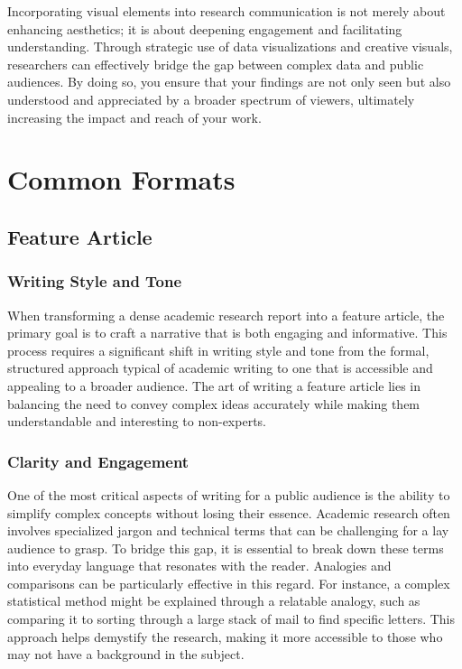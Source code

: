 \documentclass[
]{book}
\begin{document}
Incorporating visual elements into research communication is not merely about enhancing aesthetics; it is about deepening engagement and facilitating understanding. Through strategic use of data visualizations and creative visuals, researchers can effectively bridge the gap between complex data and public audiences. By doing so, you ensure that your findings are not only seen but also understood and appreciated by a broader spectrum of viewers, ultimately increasing the impact and reach of your work.

\section{Common Formats}\label{common-formats}

\subsection{Feature Article}\label{feature-article}

\subsubsection*{Writing Style and Tone}\label{writing-style-and-tone}

When transforming a dense academic research report into a feature article, the primary goal is to craft a narrative that is both engaging and informative. This process requires a significant shift in writing style and tone from the formal, structured approach typical of academic writing to one that is accessible and appealing to a broader audience. The art of writing a feature article lies in balancing the need to convey complex ideas accurately while making them understandable and interesting to non-experts.

\subsubsection*{Clarity and Engagement}\label{clarity-and-engagement}

One of the most critical aspects of writing for a public audience is the ability to simplify complex concepts without losing their essence. Academic research often involves specialized jargon and technical terms that can be challenging for a lay audience to grasp. To bridge this gap, it is essential to break down these terms into everyday language that resonates with the reader. Analogies and comparisons can be particularly effective in this regard. For instance, a complex statistical method might be explained through a relatable analogy, such as comparing it to sorting through a large stack of mail to find specific letters. This approach helps demystify the research, making it more accessible to those who may not have a background in the subject.
\end{document}
